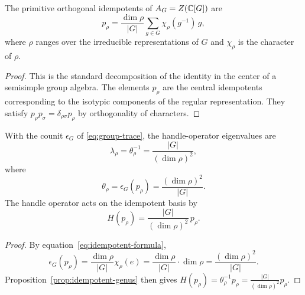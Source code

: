 \begin{proposition}\label{prop:ZG-idempotents}
The primitive orthogonal idempotents of $A_G = Z(\mathbb{C}[G])$ are
\begin{equation}\label{eq:idempotent-formula}
p_\rho = \frac{\dim \rho}{|G|} \sum_{g \in G} \chi_\rho(g^{-1})\, g,
\end{equation}
where $\rho$ ranges over the irreducible representations of $G$ and $\chi_\rho$ is the character of $\rho$.
\end{proposition}

\begin{proof}
This is the standard decomposition of the identity in the center of a semisimple group algebra. The elements $p_\rho$ are the central idempotents corresponding to the isotypic components of the regular representation. They satisfy $p_\rho p_\sigma = \delta_{\rho\sigma} p_\rho$ by orthogonality of characters.
\end{proof}

\begin{proposition}\label{prop:handle-spectrum-G}
With the counit $\epsilon_G$ of \eqref{eq:group-trace}, the handle-operator eigenvalues are
\begin{equation}\label{eq:handle-eigenvalue}
\lambda_\rho = \theta_\rho^{-1} = \frac{|G|}{(\dim \rho)^2},
\end{equation}
where
\begin{equation}\label{eq:theta-rho}
\theta_\rho = \epsilon_G(p_\rho) = \frac{(\dim \rho)^2}{|G|}.
\end{equation}
The handle operator acts on the idempotent basis by
\begin{equation}\label{eq:H-on-p-rho}
H(p_\rho) = \frac{|G|}{(\dim \rho)^2}\, p_\rho.
\end{equation}
\end{proposition}

\begin{proof}
By equation~\eqref{eq:idempotent-formula},
\begin{equation}\label{eq:epsilon-p-rho-calc}
\epsilon_G(p_\rho) = \frac{\dim \rho}{|G|} \chi_\rho(e) = \frac{\dim \rho}{|G|} \cdot \dim \rho = \frac{(\dim \rho)^2}{|G|}.
\end{equation}
Proposition~\ref{prop:idempotent-genus} then gives $H(p_\rho) = \theta_\rho^{-1} p_\rho = \frac{|G|}{(\dim \rho)^2} p_\rho$.
\end{proof}

